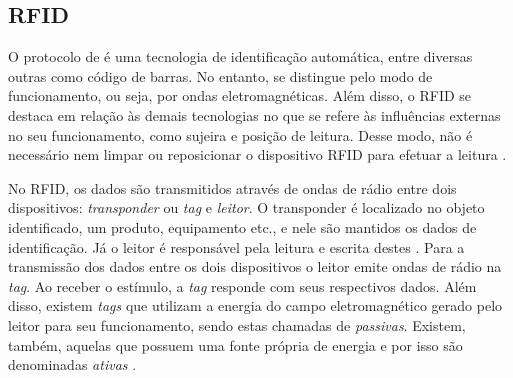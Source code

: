 \subsection{RFID}

O protocolo de  é uma tecnologia de identificação automática, entre diversas outras como código de barras. No entanto, se distingue pelo modo de funcionamento, ou seja, por ondas eletromagnéticas. Além disso, o RFID se destaca em relação às demais tecnologias no que se refere às influências externas no seu funcionamento, como sujeira e posição de leitura. Desse modo, não é necessário nem limpar ou reposicionar o dispositivo RFID para efetuar a leitura \cite{Finkenzeller2010}. 

No RFID, os dados são transmitidos através de ondas de rádio entre dois dispositivos: \textit{transponder} ou \textit{tag} e \textit{leitor}. O transponder é localizado no objeto identificado, um produto, equipamento etc., e nele são mantidos os dados de identificação. Já o leitor é responsável pela leitura e escrita destes \cite{Finkenzeller2010}.
Para a transmissão dos dados entre os dois dispositivos o leitor emite ondas de rádio na \textit{tag}. Ao receber o estímulo, a \textit{tag} responde com seus respectivos dados. Além disso, existem \textit{tags} que utilizam a energia do campo eletromagnético gerado pelo leitor para seu funcionamento, sendo estas chamadas de \textit{passivas}. Existem, também, aquelas que possuem uma fonte própria de energia e por isso são denominadas \textit{ativas} \cite{Finkenzeller2010}.





